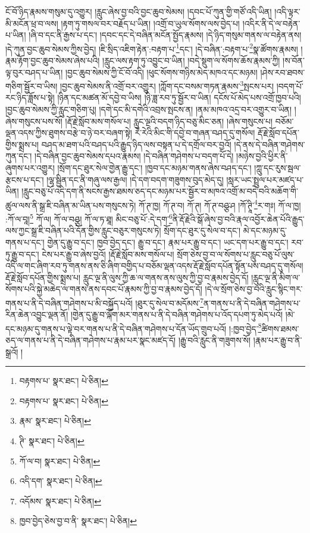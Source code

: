 ངོ་བོ་ཉིད་རྣམས་གསུམ་དུ་འགྱུར། །རླུང་ཞེས་བྱ་བའི་བྱང་ཆུབ་སེམས། །དབང་པོ་ཀུན་གྱི་གཙོ་འདི་ཡིན། །འདི་ལྟར་མི་མངོན་ཕྲ་བ་ལས། །རྟག་ཏུ་གསལ་བར་བརྗོད་པ་ཡིན། །འགྲོ་བ་ཡུལ་སོགས་ལས་བྱེད་པ། །འདིར་ནི་དེ་ལ་བརྟེན་པ་ཡིན། །ཞི་བ་དང་ནི་རྒྱས་པ་དང་། །དབང་དང་དེ་བཞིན་མངོན་སྤྱོད་རྣམས། །དེ་ཉིད་གསུམ་གནས་ལ་བརྟེན་ནས། །དེ་ཀུན་བྱང་ཆུབ་སེམས་ཀྱིས་བྱེད། །ཇི་སྲིད་འཇིག་རྟེན་:བརྟག་པ་\footnote{བརྟགས་པ་  སྣར་ཐང་།  པེ་ཅིན། }དང་། །དེ་བཞིན་:བརྟག་པ་\footnote{བརྟགས་པ་  སྣར་ཐང་།  པེ་ཅིན། }སྣ་ཚོགས་རྣམས། །རྣམ་རྟོག་བྱང་ཆུབ་སེམས་ཞེས་པའི། །རླུང་ལས་རྟག་ཏུ་འབྱུང་བ་ཡིན། །བདེ་སྡུག་ལ་སོགས་ཆོས་རྣམས་ཀྱི། །ས་བོན་ལྟ་བུར་བཤད་པ་ཡིན། །བྱང་ཆུབ་སེམས་ཀྱི་ངོ་བོ་འདི། །ཕུང་སོགས་གཉིས་མེད་མཁའ་དང་མཉམ། །ཤེས་རབ་ཐབས་གཅིག་སྦྱོར་བ་ཡིས། །བྱང་ཆུབ་སེམས་ནི་འགྲོ་བར་འགྱུར། །ཀློག་དང་བསམ་གཏན་རྣམས་\footnote{རྣམ་  སྣར་ཐང་།  པེ་ཅིན། }སྤངས་པར། །བདག་པོ་རང་ཉིད་ཟློས་པ་སྟེ། །ཉིན་དང་མཚན་མོ་དབྱེ་བ་ཡིས། །ཉི་ཟླ་རབ་ཏུ་སྦྱོར་བ་ཡིན། དངོས་པོ་མེད་པས་འགྲོ་ཁྱབ་པའི། །བྱང་ཆུབ་སེམས་ཀྱི་རླུང་གཅིག་པུ། །དགེ་དང་མི་དགེའི་འབྲས་སྤངས་ན། །ནམ་མཁའ་འདྲ་བར་འགྱུར་བ་ཡིན། །ཞེས་གསུངས་པས་སོ། །རྡོ་རྗེ་སློབ་མས་གསོལ་པ། རླུང་ལྔའི་བདག་ཉིད་བཅུ་མིང་ཅན། །ཞེས་གསུངས་པ། བཅོམ་ལྡན་འདས་ཀྱིས་ཐུགས་བརྩེ་བ་ཉེ་བར་བཞག་སྟེ། རེ་རེའི་མིང་གི་དབྱེ་བ་གཞན་བཤད་དུ་གསོལ། རྡོ་རྗེ་སློབ་དཔོན་གྱིས་སྨྲས་པ། བཤད་མ་ཐག་པའི་བཤད་པའི་རྒྱུད་ཉིད་ལས་བསྟན་པ་དེ་དགྲོལ་བར་བྱའོ། །དེ་ནས་དེ་བཞིན་གཤེགས་ཀུན་དང་། །དེ་བཞིན་བྱང་ཆུབ་སེམས་དཔའ་རྣམས། །དེ་བཞིན་གཤེགས་པ་བདག་པོ་དེ། །མཉེས་བྱའི་ཕྱིར་ནི་ཞུགས་པར་འགྱུར། །སྲོག་དང་ཐུར་སེལ་གྱེན་རྒྱུ་དང་། །ཁྱབ་དང་མཉམ་གནས་ཞེས་བཤད་དང་། །ཀླུ་དང་རུས་སྦལ་རྩངས་པ་དང་། །ལྷ་སྦྱིན་དང་ནི་གཞུ་ལས་རྒྱལ། །དེ་དག་བདག་གཟུགས་བུད་མེད་དུ། །སླར་ཡང་སྤྲུལ་པར་མཛད་པ་ཡིན། །རླུང་བཅུ་པོ་འདི་དག་ནི་སངས་རྒྱས་ཐམས་ཅད་དང་མཉམ་པར་སྦྱོར་བ་མཁའ་འགྲོ་མ་བདེ་བའི་མཆོག་གི་ཚུལ་ལས་ནི་སྒྲ་ཇི་བཞིན་མ་ཡིན་པས་གསུངས་ཏེ། ཀོ་ཊ་ཁྱ། ཀོ་ཊ་བ། ཀོ་ཊ། ཀོ་ཊ་བཤྩ་ཤ །ཀོ་ཊཱི་\footnote{ཊི་  སྣར་ཐང་།  པེ་ཅིན། }ར་གཿ། ཀོ་ལ་ཁྱ། :ཀོ་ལ་བཱ།\footnote{ཀོ་ལ་བ།  སྣར་ཐང་།  པེ་ཅིན། } ཀོ་ལ། ཀོ་ལ་བཤྩ། ཀོ་ལ་ཏ་ཐཱ། མིང་བཅུ་པོ་:དེ་དག་\footnote{འདི་དག་  སྣར་ཐང་།  པེ་ཅིན། }ནི་རྡོ་རྗེའི་སྒོ་ཞེས་བྱ་བའི་རྣལ་འབྱོར་ཆེན་པོའི་རྒྱུད་ལས་ཀྱང་སྒྲ་ཇི་བཞིན་པའི་དོན་གྱིས་རླུང་བཅུར་གསུངས་ཏེ། སྲོག་དང་ཐུར་དུ་སེལ་བ་དང་། མེ་དང་མཉམ་དུ་གནས་པ་དང་། གྱེན་དུ་རྒྱུ་བ་དང་། ཁྱབ་བྱེད་དང་། རྒྱུ་བ་དང་། རྣམ་པར་རྒྱུ་བ་དང་། ཡང་དག་པར་རྒྱུ་བ་དང་། རབ་ཏུ་རྒྱུ་བ་དང་། ངེས་པར་རྒྱུ་བ་ཞེས་བྱའོ། །རྡོ་རྗེ་སློབ་མས་གསོལ་པ། སྲོག་ཅེས་བྱ་བ་ལ་སོགས་པ་རླུང་བཅུ་པོ་ལུས་འདི་ལ་གང་ཞིག་རབ་ཏུ་གནས་ནས་ཅི་ཞིག་བགྱིད་པ་བཅོམ་ལྡན་འདས་རྡོ་རྗེ་སློབ་དཔོན་སྟོན་པས་བཤད་དུ་གསོལ། རྡོ་རྗེ་སློབ་དཔོན་གྱིས་སྨྲས་པ། རླུང་ལྔ་ནི་ལུས་ཀྱི་ཆ་ལ་གནས་ནས་ལུས་ཀྱི་བྱ་བ་རྣམས་བྱེད་དོ། །རླུང་ལྔ་ནི་མིག་ལ་སོགས་པའི་སྐྱེ་མཆེད་ལ་གནས་ནས་དབང་པོ་རྣམས་ཀྱི་བྱ་བ་རྣམས་བྱེད་དོ། །དེ་ལ་སྲོག་ཅེས་བྱ་བའི་རླུང་སྙིང་གར་གནས་པ་ནི་དེ་བཞིན་གཤེགས་པ་མི་བསྐྱོད་པའོ། །ཐུར་དུ་སེལ་བ་མདོམས་\footnote{འདོམས་  སྣར་ཐང་།  པེ་ཅིན། }ན་གནས་པ་ནི་དེ་བཞིན་གཤེགས་པ་རིན་ཆེན་འབྱུང་ལྡན་ནོ། །གྱེན་དུ་རྒྱུ་བ་ལྐོག་མར་གནས་པ་ནི་དེ་བཞིན་གཤེགས་པ་འོད་དཔག་ཏུ་མེད་པའོ། །མེ་དང་མཉམ་དུ་གནས་པ་ལྟེ་བར་གནས་པ་ནི་དེ་བཞིན་གཤེགས་པ་དོན་ཡོད་གྲུབ་པའོ། །:ཁྱབ་བྱེད་\footnote{ཁྱབ་བྱེད་ཅེས་བྱ་བ་ནི་  སྣར་ཐང་།  པེ་ཅིན། }ཚིགས་ཐམས་ཅད་ལ་གནས་པ་ནི་དེ་བཞིན་གཤེགས་པ་རྣམ་པར་སྣང་མཛད་དོ། །རྒྱུ་བའི་རླུང་ནི་གཟུགས་སོ། །རྣམ་པར་རྒྱུ་བ་ནི་སྒྲའོ། །

